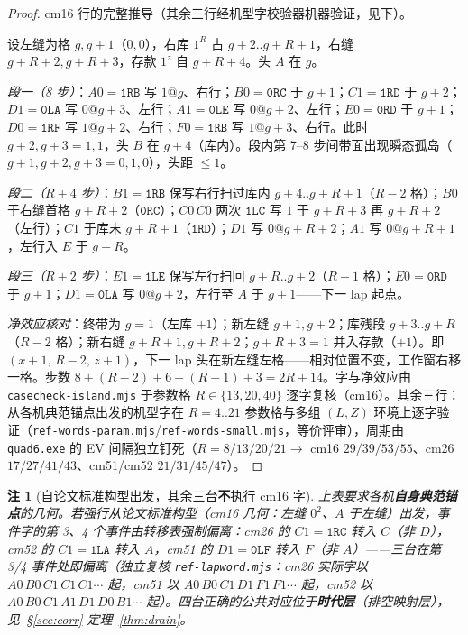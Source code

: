 \documentclass[11pt]{ctexart}
\newtheorem{remark}[theorem]{注}
\begin{document}
\begin{proof}
cm16 行的完整推导（其余三行经机型字校验器机器验证，见下）。

设左缝为格 $g,g{+}1$（$0,0$），右库 $1^R$ 占 $g{+}2..g{+}R{+}1$，右缝 $g{+}R{+}2,g{+}R{+}3$，存款 $1^z$ 自 $g{+}R{+}4$。头 $A$ 在 $g$。

\emph{段一（8 步）}：$A0{=}\texttt{1RB}$ 写 $1@g$、右行；$B0{=}\texttt{0RC}$ 于 $g{+}1$；$C1{=}\texttt{1RD}$ 于 $g{+}2$；$D1{=}\texttt{0LA}$ 写 $0@g{+}3$、左行；$A1{=}\texttt{0LE}$ 写 $0@g{+}2$、左行；$E0{=}\texttt{0RD}$ 于 $g{+}1$；$D0{=}\texttt{1RF}$ 写 $1@g{+}2$、右行；$F0{=}\texttt{1RB}$ 写 $1@g{+}3$、右行。此时 $g{+}2,g{+}3=1,1$，头 $B$ 在 $g{+}4$（库内）。段内第 7--8 步间带面出现瞬态孤岛（$g{+}1,g{+}2,g{+}3=0,1,0$），头距 $\le1$。

\emph{段二（$R{+}4$ 步）}：$B1{=}\texttt{1RB}$ 保写右行扫过库内 $g{+}4..g{+}R{+}1$（$R{-}2$ 格）；$B0$ 于右缝首格 $g{+}R{+}2$（$\texttt{0RC}$）；$C0\,C0$ 两次 $\texttt{1LC}$ 写 $1$ 于 $g{+}R{+}3$ 再 $g{+}R{+}2$（左行）；$C1$ 于库末 $g{+}R{+}1$（$\texttt{1RD}$）；$D1$ 写 $0@g{+}R{+}2$；$A1$ 写 $0@g{+}R{+}1$，左行入 $E$ 于 $g{+}R$。

\emph{段三（$R{+}2$ 步）}：$E1{=}\texttt{1LE}$ 保写左行扫回 $g{+}R..g{+}2$（$R{-}1$ 格）；$E0{=}\texttt{0RD}$ 于 $g{+}1$；$D1{=}\texttt{0LA}$ 写 $0@g{+}2$，左行至 $A$ 于 $g{+}1$——下一 lap 起点。

\emph{净效应核对}：终带为 $g{=}1$（左库 $+1$）；新左缝 $g{+}1,g{+}2$；库残段 $g{+}3..g{+}R$（$R{-}2$ 格）；新右缝 $g{+}R{+}1,g{+}R{+}2$；$g{+}R{+}3{=}1$ 并入存款（$+1$）。即 $(x{+}1,\,R{-}2,\,z{+}1)$，下一 lap 头在新左缝左格——相对位置不变，工作窗右移一格。步数 $8+(R{-}2)+6+(R{-}1)+3=2R{+}14$。字与净效应由 \texttt{casecheck-island.mjs} 于参数格 $R\in\{13,20,40\}$ 逐字复核（cm16）。其余三行：从各机典范锚点出发的机型字在 $R=4..21$ 参数格与多组 $(L,Z)$ 环境上逐字验证（\texttt{ref-words-param.mjs}/\texttt{ref-words-small.mjs}，等价评审），周期由 \texttt{quad6.exe} 的 EV 间隔独立钉死（$R{=}8/13/20/21\to$ cm16 $29/39/53/55$、cm26 $17/27/41/43$、cm51/cm52 $21/31/45/47$）。
\end{proof}

\begin{remark}[自论文标准构型出发，其余三台\textbf{不}执行 cm16 字]\label{rem:lapdiff}
上表要求各机\textbf{自身典范锚点}的几何。若强行从论文标准构型（cm16 几何：左缝 $0^2$、$A$ 于左缝）出发，事件字的第 3、4 个事件由转移表强制偏离：cm26 的 $C1=\texttt{1RC}$ 转入 $C$（非 $D$），cm52 的 $C1=\texttt{1LA}$ 转入 $A$，cm51 的 $D1=\texttt{0LF}$ 转入 $F$（非 $A$）——三台在第 3/4 事件处即偏离（独立复核 \texttt{ref-lapword.mjs}：cm26 实际字以 $A0\,B0\,C1\,C1\,C1\cdots$ 起，cm51 以 $A0\,B0\,C1\,D1\,F1\,F1\cdots$ 起，cm52 以 $A0\,B0\,C1\,A1\,D1\,D0\,B1\cdots$ 起）。四台正确的公共对应位于\textbf{时代层}（排空映射层），见~\S\ref{sec:corr} 定理~\ref{thm:drain}。
\end{remark}
\end{document}
